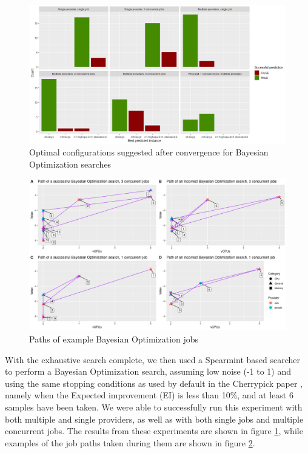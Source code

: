 \documentclass{article}
\begin{document}
\begin{figure}
  \caption{Optimal configurations suggested after convergence for Bayesian Optimization searches}
  \label{fig:bo-results}
  \centering
  \includegraphics[scale=0.5]{bo_results}
\end{figure}
\begin{figure}
	\centering
	\includegraphics[scale=0.5]{paths}
	\caption{Paths of example Bayesian Optimization jobs}
	\label{fig:paths}
\end{figure}

With the exhaustive search complete, we then used a Spearmint based searcher to perform a Bayesian Optimization search, assuming low noise (-1 to 1) and using the same stopping conditions as used by default in the Cherrypick paper \cite{Alipourfard2017}, namely when the Expected improvement (EI) is less than 10\%, and at least 6 samples have been taken. We were able to successfully run this experiment with both multiple and single providers, as well as with both single jobs and multiple concurrent jobs. The results from these experiments are shown in figure \ref{fig:bo-results}, while examples of the job paths taken during them are shown in figure \ref{fig:paths}.
\end{document}
